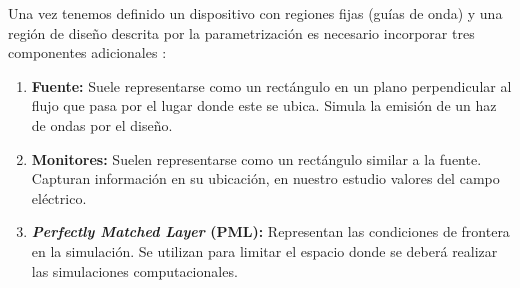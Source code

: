 Una vez tenemos definido un dispositivo con regiones fijas (guías de onda) y una
región de diseño descrita por la parametrización es necesario incorporar
tres componentes adicionales \citep{Oskooi2010, Su2020}:

\begin{enumerate}

  \item \textbf{Fuente:} Suele representarse como un rectángulo en un plano perpendicular al flujo
    que pasa por el lugar donde este se ubica. Simula la emisión de un haz de ondas por el diseño.

  \item \textbf{Monitores:} Suelen representarse como un rectángulo similar a la fuente.
    Capturan información en su ubicación, en nuestro estudio valores del campo eléctrico.

  \item \textbf{\emph{Perfectly Matched Layer} (PML):} Representan las condiciones de frontera en la simulación. 
    Se utilizan para limitar el espacio donde se deberá realizar las simulaciones computacionales.

\end{enumerate}

